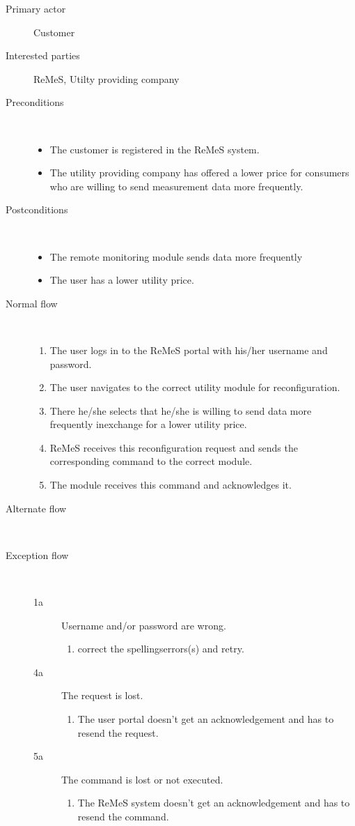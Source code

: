 \begin{description}
	\item[Primary actor] Customer
	\item[Interested parties] ReMeS, Utilty providing company
	\item[Preconditions] \ 
	\begin{itemize}
		\item The customer is registered in the ReMeS system.
		\item The utility providing company has offered a lower price for consumers
		who are willing to send measurement data more frequently.
	\end{itemize}
	\item[Postconditions] \ 
	\begin{itemize}
		\item The remote monitoring module sends data more frequently
		\item The user has a lower utility price.
	\end{itemize}
	\item[Normal flow] \ 
	\begin{enumerate}
	  	\item The user logs in to the ReMeS portal with his/her username and
	  	password.
	  	\item The user navigates to the correct utility module for reconfiguration.
	  	\item There he/she selects that he/she is willing to send data more
	  	frequently inexchange for a lower utility price.
	  	\item ReMeS receives this reconfiguration request and sends the
	  	corresponding command to the correct module.
	  	\item The module receives this command and acknowledges it.
	\end{enumerate}
	\item[Alternate flow] \ 
	\begin{description}
		\item
	\end{description}
	\item[Exception flow] \ 
	\begin{description}
		\item[1a] Username and/or password are wrong.
		\begin{enumerate}
		  \item correct the spellingserrors(s) and retry.
		\end{enumerate}
		\item[4a] The request is lost.
		\begin{enumerate}
		  \item The user portal doesn't get an acknowledgement and has to resend the
		  request.
		\end{enumerate}
		\item[5a] The command is lost or not executed.
		\begin{enumerate}
		  \item The ReMeS system doesn't get an acknowledgement and has to resend the
		  command.
		 \end{enumerate}
	\end{description}
\end{description}